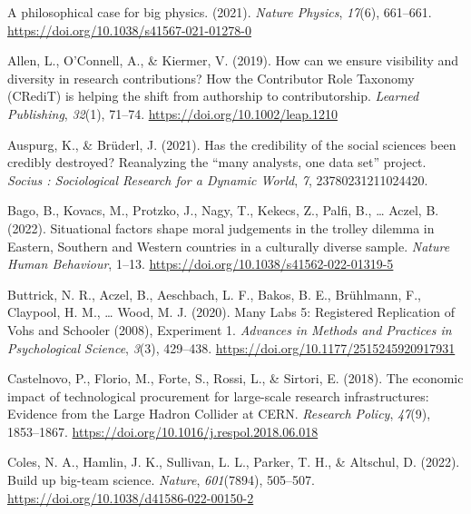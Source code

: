 \documentclass[
  man,floatsintext]{apa6}
\newlength{\cslhangindent}
\newlength{\cslentryspacingunit} %
\newenvironment{CSLReferences}[2] %
 {%
  \setlength{\parindent}{0pt}
  \ifodd #1
  \let\oldpar\par
  \def\par{\hangindent=\cslhangindent\oldpar}
  \fi
  \setlength{\parskip}{#2\cslentryspacingunit}
 }%
 {}
\begin{document}
\hypertarget{refs}{}
\begin{CSLReferences}{1}{0}
\leavevmode{}%
A philosophical case for big physics. (2021). \emph{Nature Physics}, \emph{17}(6), 661--661. \url{https://doi.org/10.1038/s41567-021-01278-0}

\leavevmode{}%
Allen, L., O'Connell, A., \& Kiermer, V. (2019). How can we ensure visibility and diversity in research contributions? How the Contributor Role Taxonomy (CRediT) is helping the shift from authorship to contributorship. \emph{Learned Publishing}, \emph{32}(1), 71--74. \url{https://doi.org/10.1002/leap.1210}

\leavevmode{}%
Auspurg, K., \& Brüderl, J. (2021). Has the credibility of the social sciences been credibly destroyed? Reanalyzing the {``}many analysts, one data set{''} project. \emph{Socius : Sociological Research for a Dynamic World}, \emph{7}, 23780231211024420.

\leavevmode{}%
Bago, B., Kovacs, M., Protzko, J., Nagy, T., Kekecs, Z., Palfi, B., \ldots{} Aczel, B. (2022). Situational factors shape moral judgements in the trolley dilemma in Eastern, Southern and Western countries in a culturally diverse sample. \emph{Nature Human Behaviour}, 1--13. \url{https://doi.org/10.1038/s41562-022-01319-5}

\leavevmode{}%
Buttrick, N. R., Aczel, B., Aeschbach, L. F., Bakos, B. E., Brühlmann, F., Claypool, H. M., \ldots{} Wood, M. J. (2020). Many Labs 5: Registered Replication of Vohs and Schooler (2008), Experiment 1. \emph{Advances in Methods and Practices in Psychological Science}, \emph{3}(3), 429--438. \url{https://doi.org/10.1177/2515245920917931}

\leavevmode{}%
Castelnovo, P., Florio, M., Forte, S., Rossi, L., \& Sirtori, E. (2018). The economic impact of technological procurement for large-scale research infrastructures: Evidence from the Large Hadron Collider at CERN. \emph{Research Policy}, \emph{47}(9), 1853--1867. \url{https://doi.org/10.1016/j.respol.2018.06.018}

\leavevmode{}%
Coles, N. A., Hamlin, J. K., Sullivan, L. L., Parker, T. H., \& Altschul, D. (2022). Build up big-team science. \emph{Nature}, \emph{601}(7894), 505--507. \url{https://doi.org/10.1038/d41586-022-00150-2}


\end{CSLReferences}
\end{document}
